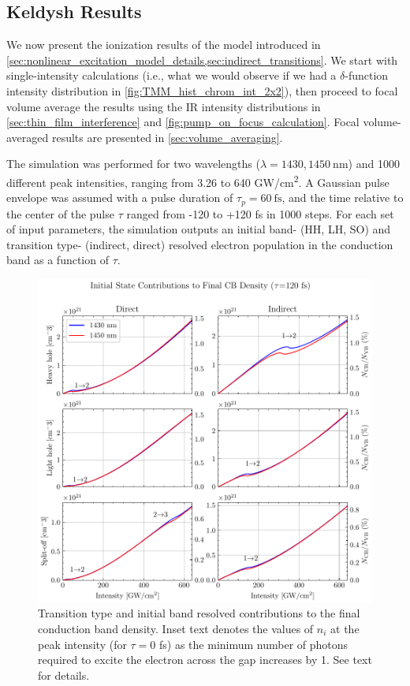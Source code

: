 \subsection{Keldysh Results}
\label{sec:nonlinear_excitation_results}

We now present the ionization results of the model introduced in \cref{sec:nonlinear_excitation_model_details,sec:indirect_transitions}. We start with single-intensity calculations (i.e., what we would observe if we had a $\delta$-function intensity distribution in \cref{fig:TMM_hist_chrom_int_2x2}), then proceed to focal volume average the results using the IR intensity distributions in \cref{sec:thin_film_interference} and \cref{fig:pump_on_focus_calculation}. Focal volume-averaged results are presented in \cref{sec:volume_averaging}.

The simulation was performed for two wavelengths ($\lambda = 1430, 1450 \ \textrm{nm}$) and 1000 different peak intensities, ranging from 3.26 to 640 GW/cm\textsuperscript{2}. A Gaussian pulse envelope was assumed with a pulse duration of $\tau_p = 60 \ \textrm{fs}$, and the time relative to the center of the pulse $\tau$ ranged from -120 to +120 fs in 1000 steps. For each set of input parameters, the simulation outputs an initial band- (HH, LH, SO) and transition type- (indirect, direct) resolved electron population in the conduction band as a function of $\tau$.

\begin{figure}
	\centering
	\includegraphics[width=1.0\textwidth]{figures/chap4/N_Channel_VB_resolved.pdf}
	\caption{Transition type and initial band resolved contributions to the final conduction band density. Inset text denotes the values of $n_i$ at the peak intensity (for $\tau=0$ fs) as the minimum number of photons required to excite the electron across the gap increases by 1. See text for details.}
	\label{fig:N_Channel_VB_resolved}
\end{figure}


